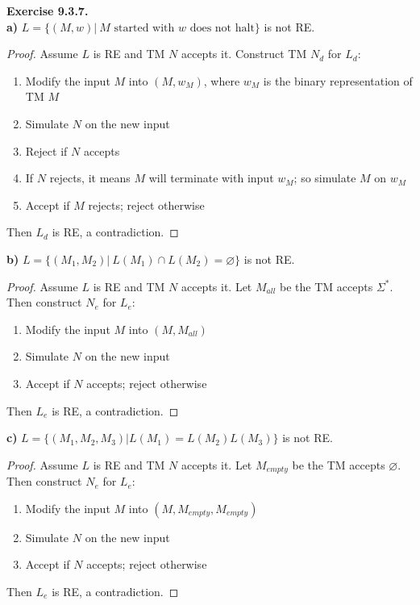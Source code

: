 \documentclass[a4paper]{article}
\newtheorem*{proof}{Proof}
\newenvironment{exercise}[1]{
	\par
	\noindent\textbf{Exercise #1.}\quad
}{
	\par
	\bigskip
}
\begin{document}
\begin{exercise}{9.3.7} \hspace{0pt}\\
\textbf{a)} $L=\big\{(M,w)\big|\ M\text{ started with }w\text{ does not halt}\big\}$ is not RE.
    \begin{proof}
        Assume $L$ is RE and TM $N$ accepts it. Construct TM $N_d$ for $L_d$:
        \begin{enumerate}
            \item Modify the input $M$ into $(M,w_M)$, where $w_M$ is the binary representation of TM $M$
            \item Simulate $N$ on the new input
            \item Reject if $N$ accepts
            \item If $N$ rejects, it means $M$ will terminate with input $w_M$; so
                simulate $M$ on $w_M$
            \item Accept if $M$ rejects; reject otherwise
        \end{enumerate}
        Then $L_d$ is RE, a contradiction.
    \end{proof}
\textbf{b)} $L=\big\{(M_1,M_2)\big|\ L(M_1)\cap L(M_2)=\varnothing\big\}$ is not RE.
    \begin{proof}
        Assume $L$ is RE and TM $N$ accepts it. Let $M_{all}$ be the TM accepts $\Sigma^*$.
        Then construct $N_{e}$ for $L_e$:
        \begin{enumerate}
            \item Modify the input $M$ into $(M,M_{all})$
            \item Simulate $N$ on the new input
            \item Accept if $N$ accepts; reject otherwise
        \end{enumerate}
        Then $L_e$ is RE, a contradiction.
    \end{proof}
\textbf{c)} $L=\big\{(M_1,M_2,M_3)\big|L(M_1)=L(M_2)L(M_3)\big\}$ is not RE.
    \begin{proof}
        Assume $L$ is RE and TM $N$ accepts it. Let $M_{empty}$ be the TM accepts $\varnothing$.
        Then construct $N_{e}$ for $L_e$:
        \begin{enumerate}
            \item Modify the input $M$ into $(M,M_{empty},M_{empty})$
            \item Simulate $N$ on the new input
            \item Accept if $N$ accepts; reject otherwise
        \end{enumerate}
        Then $L_e$ is RE, a contradiction.
    \end{proof}
\end{exercise}
\end{document}
